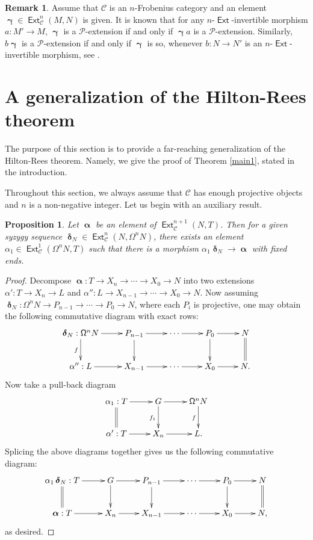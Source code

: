 \documentclass[11pt,a4paper]{amsart}
\newcommand{\rt}{\rightarrow}
\newcommand{\lrt}{\longrightarrow}
\newcommand{\C}{\mathscr{C} }
\newcommand{\p}{\mathfrak{p} }
\def\Ext{\operatorname{{\mathsf{Ext}}}}
\def\syz{\mathsf{\Omega}}
\def\p{\mathcal P}
\def\al{\operatorname{\boldsymbol{\alpha}}}
\def\ga{\operatorname{\boldsymbol{\gamma}}}
\def\de{\operatorname{\boldsymbol{\delta}}}
\newtheorem{prop}[theorem]{Proposition}
\theoremstyle{definition}
\newtheorem{rem}[theorem]{Remark}
\theoremstyle{plain}
\theoremstyle{definition}
\numberwithin{equation}{section}
\begin{document}
\begin{rem}\label{invert}Assume that $\C$ is an $n$-Frobenius category and  an element $\ga\in\Ext^n_{\C}(M, N)$ is given. It is known that for any $n$-$\Ext$-invertible morphism $a:M'\rt M$, $\ga$ is a $\p$-extension if and only if $\ga a$ is a $\p$-extension. Similarly, $b\ga$ is a $\p$-extension if and only if $\ga$ is so, whenever $b:N\rt N'$ is an $n$-$\Ext$-invertible morphism, see \cite[Proposition 4.9]{bfss}.
\end{rem}

\section{A generalization of the Hilton-Rees theorem}
The purpose of this section is to provide a far-reaching generalization of the Hilton-Rees theorem. Namely, we give the proof of  Theorem \ref{main1}, stated in the introduction.

Throughout this section, we always assume that $\C$ has enough projective objects and $n$ is a non-negative integer. Let us begin with an auxiliary result.

\begin{prop}\label{1}Let $\al$ be an element of $\Ext^{n+1}_{\C}(N, T)$. Then for a given syzygy sequence $\de_N\in\Ext^n_{\C}(N, \syz^nN)$, there exists an element $\alpha_1\in\Ext^1_{\C}(\syz^nN, T)$ such that there is a morphism $\alpha_1\de_N\lrt\al$ with fixed ends.
\end{prop}
\begin{proof}Decompose $\al: T\rt X_n\rt\cdots\rt X_0\rt N$ into two extensions $\alpha':T\rt X_n\rt L$ and $\alpha'': L\rt X_{n-1}\rt\cdots\rt X_0\rt N$. Now assuming $\de_N:\syz^nN\rt P_{n-1}\rt\cdots\rt P_0\rt N$, where each $P_i$ is projective, one may obtain the following commutative diagram with exact rows: {\footnotesize\[\xymatrix{\de_N:\syz^{n}N\ar[d]_{f}\ar[r] & P_{n-1}\ar[d]\ar[r] & \cdots\ar[r] & P_0\ar[r]\ar[d] & N\ar@{=}[d]\\
\alpha'':L\ar[r] & X_{n-1}\ar[r] & \cdots\ar[r] & X_0\ar[r] & N.}\]}Now take a pull-back diagram
{\footnotesize \[\xymatrix{\alpha_1:T\ar[r]\ar@{=}[d] & G\ar[r]\ar[d]_{f_1} & \syz^{n}N\ar[d]_{f} \\ \alpha':T\ar[r] & X_{n}\ar[r]& L.}\] }
Splicing the above diagrams together gives us the following commutative diagram:
{\footnotesize\[\xymatrix{\alpha_1\de_N:T\ar[r]\ar@{=}[d]& G\ar[d]\ar[r] & P_{n-1}\ar[d]\ar[r] & \cdots\ar[r] & P_0\ar[r]\ar[d] & N\ar@{=}[d]\\ \al: T\ar[r]& X_{n}\ar[r] & X_{n-1}\ar[r] & \cdots\ar[r] & X_0\ar[r] & N,}\]}as desired.
\end{proof}
\end{document}
